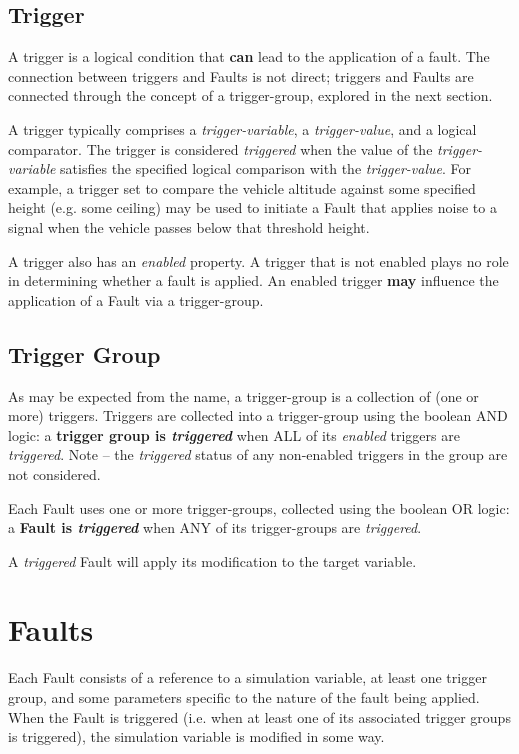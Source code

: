 \documentclass[11pt,fleqn]{report}
\begin{document}
\subsection{Trigger}
\par A trigger is a logical condition that \textbf{can} lead to the
application of a fault. The connection between triggers and Faults is
not direct; triggers and Faults are connected through the concept of a
trigger-group, explored in the next section.

A trigger typically comprises a \textit{trigger-variable}, a
\textit{trigger-value}, and a logical comparator.
The trigger is considered \textit{triggered} when the value of the
\textit{trigger-variable} satisfies the specified logical comparison with the
\textit{trigger-value}.
For example, a trigger set to compare the vehicle altitude against some
specified height (e.g. some ceiling) may be used to initiate a Fault that
applies noise to a signal when the
vehicle passes below that threshold height.

A trigger also has an \textit{enabled} property. A trigger that is not enabled
plays no role in determining whether a fault is applied. An enabled trigger
\textbf{may} influence the application of a Fault via a trigger-group.

\subsection{Trigger Group}
\par As may be expected from the name, a trigger-group is a collection of
(one or more) triggers. Triggers are collected into a trigger-group using the
boolean AND logic:
a \textbf{trigger group is \textit{triggered}} when ALL of its \textit{enabled}
triggers are \textit{triggered}. Note -- the \textit{triggered} status of any
non-enabled triggers in the group are not considered.

Each Fault uses one or more trigger-groups, collected using the boolean OR
logic: a \textbf{Fault is \textit{triggered}} when ANY of its trigger-groups are
\textit{triggered}.

A \textit{triggered} Fault will apply its modification to
the target variable.


\section{Faults} \label{sec:intro:faults}
\par Each Fault consists of a reference to a simulation variable, at least one
trigger group, and some parameters specific to the nature of the fault being
applied.
When the Fault is triggered (i.e. when at least one of its associated trigger
groups is triggered),
the simulation variable is modified in some way.
\end{document}
